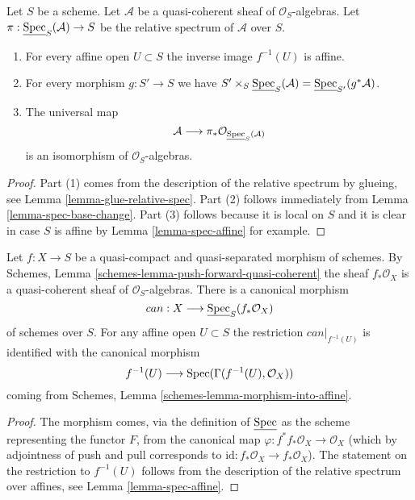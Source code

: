 \begin{lemma}
\label{lemma-spec-properties}
Let $S$ be a scheme. Let $\mathcal{A}$ be a quasi-coherent
sheaf of $\mathcal{O}_S$-algebras. Let
$\pi : \underline{\mathop{\rm Spec}}_S(\mathcal{A}) \to S$
be the relative spectrum of $\mathcal{A}$ over $S$.
\begin{enumerate}
\item For every affine open $U \subset S$ the inverse image
$f^{-1}(U)$ is affine.
\item For every morphism $g : S' \to S$ we have
$S' \times_S \underline{\mathop{\rm Spec}}_S(\mathcal{A}) =
\underline{\mathop{\rm Spec}}_{S'}(g^*\mathcal{A})$.
\item
The universal map
$$
\mathcal{A}
\longrightarrow
\pi_*\mathcal{O}_{\underline{\mathop{\rm Spec}}_S(\mathcal{A})}
$$
is an isomorphism of $\mathcal{O}_S$-algebras.
\end{enumerate}
\end{lemma}

\begin{proof}
Part (1) comes from the description of the relative spectrum
by glueing, see Lemma \ref{lemma-glue-relative-spec}.
Part (2) follows immediately from Lemma \ref{lemma-spec-base-change}.
Part (3) follows because it is local on $S$ and it is clear in case $S$
is affine by Lemma \ref{lemma-spec-affine} for example.
\end{proof}

\begin{lemma}
\label{lemma-canonical-morphism}
Let $f : X \to S$ be a quasi-compact and quasi-separated morphism
of schemes. By Schemes, Lemma \ref{schemes-lemma-push-forward-quasi-coherent}
the sheaf $f_*\mathcal{O}_X$ is a quasi-coherent sheaf of
$\mathcal{O}_S$-algebras. There is a canonical morphism
$$
can : X \longrightarrow \underline{\mathop{\rm Spec}}_S(f_*\mathcal{O}_X)
$$
of schemes over $S$.
For any affine open $U \subset S$ the restriction $can|_{f^{-1}(U)}$
is identified with the canonical morphism
$$
f^{-1}(U) \longrightarrow \mathop{\rm Spec}(\Gamma(f^{-1}(U), \mathcal{O}_X))
$$
coming from Schemes, Lemma \ref{schemes-lemma-morphism-into-affine}.
\end{lemma}

\begin{proof}
The morphism comes, via the definition of $\underline{\mathop{\rm Spec}}$
as the scheme representing the functor $F$, from the canonical map
$\varphi : f^*f_*\mathcal{O}_X \to \mathcal{O}_X$ (which by adjointness of
push and pull corresponds to
$\text{id} : f_*\mathcal{O}_X \to f_*\mathcal{O}_X$).
The statement on the restriction to $f^{-1}(U)$
follows from the description of the relative spectrum over
affines, see Lemma \ref{lemma-spec-affine}.
\end{proof}











